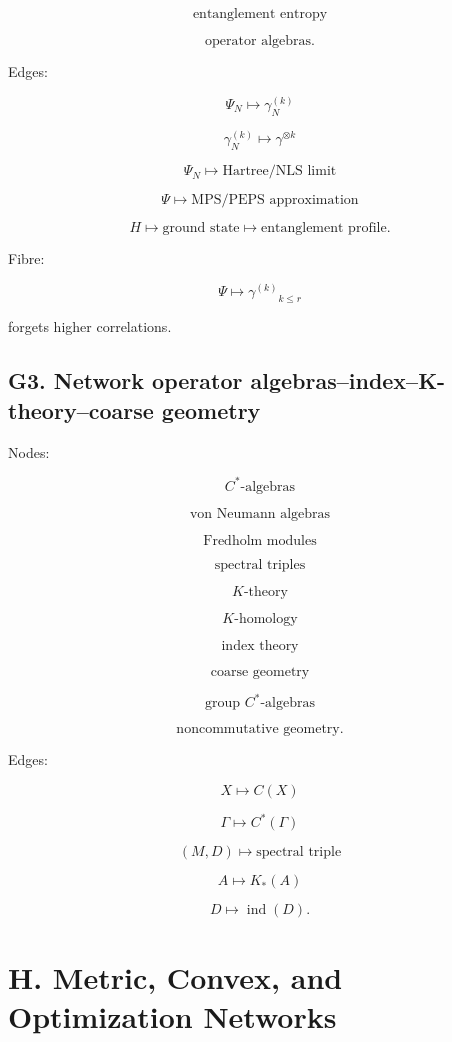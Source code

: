 \documentclass[11pt]{article}
\begin{document}
\[
\text{entanglement entropy}
\]

\[
\text{operator algebras}.
\]

Edges:

\[
\Psi_N\mapsto \gamma_N^{(k)}
\]

\[
\gamma_N^{(k)}\mapsto \gamma^{\otimes k}
\]

\[
\Psi_N\mapsto \text{Hartree/NLS limit}
\]

\[
\Psi\mapsto \text{MPS/PEPS approximation}
\]

\[
H\mapsto \text{ground state}\mapsto \text{entanglement profile}.
\]

Fibre:

\[
\Psi\mapsto {\gamma^{(k)}}_{k\le r}
\]

forgets higher correlations.



\subsection{G3. Network operator algebras--index--K-theory--coarse geometry}

Nodes:

\[
C^\ast\text{-algebras}
\]

\[
\text{von Neumann algebras}
\]

\[
\text{Fredholm modules}
\]

\[
\text{spectral triples}
\]

\[
K\text{-theory}
\]

\[
K\text{-homology}
\]

\[
\text{index theory}
\]

\[
\text{coarse geometry}
\]

\[
\text{group }C^\ast\text{-algebras}
\]

\[
\text{noncommutative geometry}.
\]

Edges:

\[
X\mapsto C(X)
\]

\[
\Gamma\mapsto C^\ast(\Gamma)
\]

\[
(M,D)\mapsto \text{spectral triple}
\]

\[
A\mapsto K_\ast(A)
\]

\[
D\mapsto \operatorname{ind}(D).
\]



\section{H. Metric, Convex, and Optimization Networks}
\end{document}
